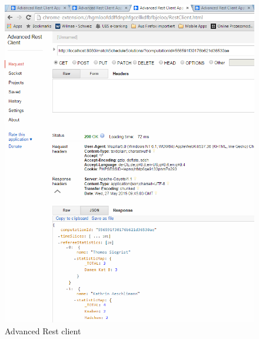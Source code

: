 \begin{figure}[h]
\centering
\includegraphics[scale=0.65]{images/advanced_rest_client.png}
\caption[Advanced Rest client]{Advanced Rest client \selfmade{}}
\label{fig:advanced_rest_client}
\end{figure}